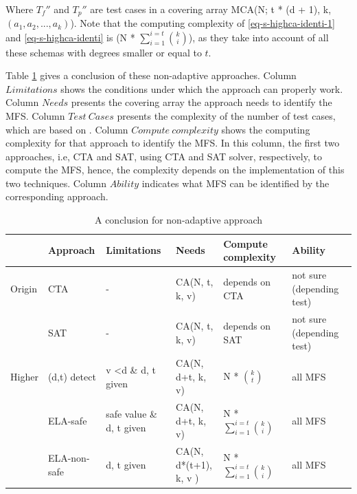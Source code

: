 \documentclass[10pt,journal,cspaper,compsoc]{IEEEtran}
\begin{document}
Where $T_{f}''$ and $T_{p}''$ are test cases in a covering array MCA(N; t * (d + 1), k, $(a_{1}, a_{2}, ..., a_{k})$). Note that the computing complexity of \ref{eq-s-highca-identi-1} and \ref{eq-s-highca-identi} is (N * $\sum_{i = 1}^{i = t} \binom{k}{i}$), as they take into account of all these schemas with degrees smaller or equal to $t$.

Table \ref{non-adaptive-conclusion}  gives a conclusion of these non-adaptive approaches. Column $Limitations$ shows the conditions under which the approach can properly work. Column $Needs$ presents the covering array the approach needs to identify the MFS. Column $Test\ Cases$ presents the complexity of the number of test cases, which are based on \cite{bryce2009density}.  Column $Compute\ complexity$ shows the computing complexity for that approach to identify the MFS. In this column, the first two approaches, i.e, CTA and SAT, using CTA and SAT solver, respectively, to compute the MFS, hence, the complexity depends on the implementation of this two techniques.  Column $Ability$ indicates what MFS can be identified by the corresponding approach.

\begin{table}[htbp]
\centering
\caption{A conclusion for non-adaptive approach}
\label{non-adaptive-conclusion}
\begin{tabular}{|l|l|l|l|l|l|}
\hline
         & Approach     & Limitations          & Needs                         & Compute complexity           & Ability                      \\ \hline
Origin & CTA          & -                      & CA(N, t, k, v)                   & depends on CTA & not sure  (depending test)       \\
         & SAT          & -                         & CA(N, t, k, v)                   & depends on SAT       & not sure   (depending test)       \\ \hline
Higher   & (d,t) detect & v \textless d \& d, t given & CA(N, d+t, k, v)             & N * $ \binom{k}{t}$                        & all  MFS  \\
         & ELA-safe     & safe value \& d, t given    & CA(N, d+t, k, v)             & N * $\sum_{i = 1}^{i = t} \binom{k}{i}$                        & all  MFS  \\
         & ELA-non-safe & d, t given                & CA(N, d*(t+1), k, v )          & N * $\sum_{i = 1}^{i = t} \binom{k}{i}$                        & all  MFS \\ \hline
\end{tabular}
\end{table}
\end{document}
